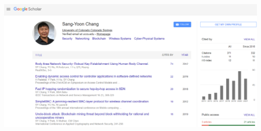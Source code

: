 \documentclass[11pt]{article}
\begin{document}
\begin{center}
\includegraphics[scale=0.45]{syc1.PNG}
\end{center}

\printbibliography
\end{document}

